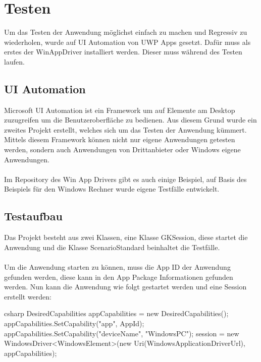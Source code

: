 \section{Testen}

Um das Testen der Anwendung möglichst einfach zu machen und Regressiv zu wiederholen, wurde auf UI Automation von UWP Apps gesetzt. Dafür muss als erstes der WinAppDriver installiert werden. Dieser muss während des Testen laufen. \cite{WinAppDriver} 

\subsection{UI Automation}

Microsoft UI Automation ist ein Framework um auf Elemente am Desktop zuzugreifen um die Benutzeroberfläche zu bedienen. Aus diesem Grund wurde ein zweites Projekt erstellt, welches sich um das Testen der Anwendung kümmert. Mittels diesem Framework können nicht nur eigene Anwendungen getesten werden, sondern auch Anwendungen von Drittanbieter oder Windows eigene Anwendungen. \cite{uiautooverview}
\\\\
Im Repository des Win App Drivers gibt es auch einige Beispiel, auf Basis des Beispiels für den Windows Rechner wurde eigene Testfälle entwickelt. \cite{WinAppDriver}

\subsection{Testaufbau}

Das Projekt besteht aus zwei Klassen, eine Klasse GKSession, diese startet die Anwendung und die Klasse ScenarioStandard beinhaltet die Testfälle.
\\\\
Um die Anwendung starten zu können, muss die App ID der Anwendung gefunden werden, diese kann in den App Package Informationen gefunden werden. \cite{appid} Nun kann die Anwendung wie folgt gestartet werden und eine Session erstellt werden:

\begin{code}{csharp}
                DesiredCapabilities appCapabilities = new DesiredCapabilities();
appCapabilities.SetCapability("app", AppId);
appCapabilities.SetCapability("deviceName", "WindowsPC");
session = new WindowsDriver<WindowsElement>(new Uri(WindowsApplicationDriverUrl), appCapabilities);
\end{code}

